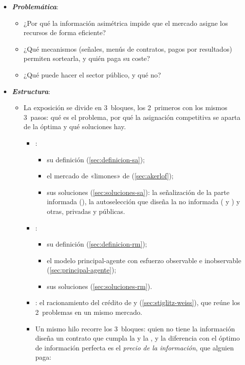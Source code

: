\documentclass[11pt]{article}
\begin{document}
\begin{itemize}
\item \textbf{\emph{Problemática}}:
  \begin{itemize}
  \item ¿Por qué la información asimétrica impide que el mercado asigne los recursos de forma eficiente?
  \item ¿Qué mecanismos (señales, menús de contratos, pagos por resultados) permiten sortearla, y quién paga su coste?
  \item ¿Qué puede hacer el sector público, y qué no?
  \end{itemize}

\item \textbf{\emph{Estructura}}:
  \begin{itemize}
  \item La exposición se divide en 3~bloques, los 2~primeros con los mismos 3~pasos: qué es el problema, por qué la asignación competitiva se aparta de la óptima y qué soluciones hay.
    \begin{itemize}
    \item {}:
      \begin{itemize}
      \item su definición (\ref{sec:definicion-sa});
      \item el mercado de «limones» de  (\ref{sec:akerlof});
      \item sus soluciones (\ref{sec:soluciones-sa}): la señalización de la parte informada (), la autoselección que diseña la no informada ( y ) y otras, privadas y públicas.
      \end{itemize}
    \item {}:
      \begin{itemize}
      \item su definición (\ref{sec:definicion-rm});
      \item el modelo principal-agente con esfuerzo observable e inobservable (\ref{sec:principal-agente});
      \item sus soluciones (\ref{sec:soluciones-rm}).
      \end{itemize}
    \item {}: el racionamiento del crédito de  y  (\ref{sec:stiglitz-weiss}), que reúne los 2~problemas en un mismo mercado.
    \item Un mismo hilo recorre los 3~bloques: quien no tiene la información diseña un contrato que cumpla la  y la , y la diferencia con el óptimo de información perfecta es el \emph{precio de la información}, que alguien paga:

\end{itemize}
\end{itemize}
\end{itemize}
\end{document}
